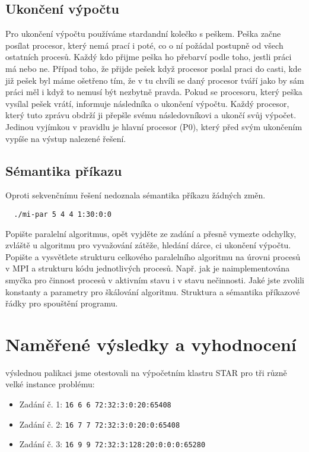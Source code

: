 \documentclass[12pt]{article}
\begin{document}
\subsection{Ukončení výpočtu}
Pro ukončení výpočtu používáme stardandní kolečko s peškem. Peška začne posílat
procesor, který nemá prací i poté, co o ní požádal postupně od všech ostatních
procesů. Každý kdo přijme peška ho přebarví podle toho, jestli práci má nebo ne.
Případ toho, že přijde pešek když procesor poslal praci do casti, kde již pešek
byl máme ošetřeno tím, že v tu chvíli se daný procesor tváří jako by sám práci
měl i když to nemusí být nezbytně pravda. Pokud se procesoru, který peška
vysílal pešek vrátí, informuje následníka o ukončení výpočtu. Každý procesor,
který tuto zprávu obdrží ji přepšle svému následovníkovi a ukončí svůj výpočet.
Jedinou vyjímkou v pravidlu je hlavní procesor (P0), který před svým ukončením
vypíše na výstup nalezené řešení.

\subsection{Sémantika příkazu}
Oproti sekvenčnímu řešení nedoznala sémantika příkazu žádných změn. 
\begin{verbatim}
  ./mi-par 5 4 4 1:30:0:0                 
\end{verbatim} 

Popište paralelní algoritmus, opět vyjděte ze zadání a přesně
vymezte odchylky, zvláště u algoritmu pro vyvažování zátěže, hledání
dárce, ci ukončení výpočtu.  Popište a vysvětlete strukturu
celkového paralelního algoritmu na úrovni procesů v MPI a strukturu
kódu jednotlivých procesů. Např. jak je naimplementována smyčka pro
činnost procesů v aktivním stavu i v stavu nečinnosti. Jaké jste
zvolili konstanty a parametry pro škálování algoritmu. Struktura a
sémantika příkazové řádky pro spouštění programu.

\section{Naměřené výsledky a vyhodnocení}

výslednou palikaci jsme otestovali na výpočetním klastru STAR pro tři různě velké instance problému:

\begin{itemize}
\item Zadání č. 1: \texttt{16 6 6 72:32:3:0:20:65408}
\item Zadání č. 2: \texttt{16 7 7 72:32:3:0:20:0:65408}
\item Zadání č. 3: \texttt{16 9 9 72:32:3:128:20:0:0:0:65280}

\end{itemize}
\end{document}
